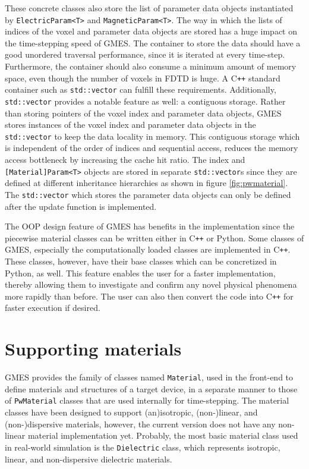 These concrete classes also store the list of parameter data objects instantiated by \texttt{ElectricParam<T>} and \texttt{MagneticParam<T>}. The way in which the lists of indices of the voxel and parameter data objects are stored has a huge impact on the time-stepping speed of GMES. The container to store the data should have a good unordered traversal performance, since it is iterated at every time-step. Furthermore, the container should also consume a minimum amount of memory space, even though the number of voxels in FDTD is huge. A C\verb!++! standard container such as \texttt{std::vector} can fulfill these requirements. Additionally, \texttt{std::vector} provides a notable feature as well: a contiguous storage. Rather than storing pointers of the voxel index and parameter data objects, GMES stores instances of the voxel index and parameter data objects in the \texttt{std::vector} to keep the data locality in memory. This contiguous storage which is independent of the order of indices and sequential access, reduces the memory access bottleneck by increasing the cache hit ratio. The index and \texttt{[Material]Param<T>} objects are stored in separate \texttt{std::vector}s since they are defined at different inheritance hierarchies as shown in figure \ref{fig:pwmaterial}. The \texttt{std::vector} which stores the parameter data objects can only be defined after the update function is implemented.

The OOP design feature of GMES has benefits in the implementation since the piecewise material classes can be written either in C\verb!++! or Python. Some classes of GMES, especially the computationally loaded classes are implemented in C\verb!++!. These classes, however, have their base classes which can be concretized in Python, as well. This feature enables the user for a faster implementation, thereby allowing them to investigate and confirm any novel physical phenomena more rapidly than before. The user can also then convert the code into C\verb!++! for faster execution if desired.

\section{Supporting materials}
\label{sec:material}
GMES provides the family of classes named \texttt{Material}, used in the front-end to define materials and structures of a target device, in a separate manner to those of \texttt{PwMaterial} classes that are used internally for time-stepping. The material classes have been designed to support (an)isotropic, (non-)linear, and (non-)dispersive materials, however, the current version does not have any non-linear material implementation yet. Probably, the most basic material class used in real-world simulation is the \texttt{Dielectric} class, which represents isotropic, linear, and non-dispersive dielectric materials.

